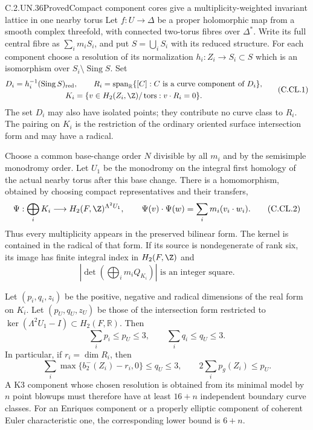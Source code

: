 \begin{statement}{C.2.UN.36}{Proved}{Compact component cores give a multiplicity-weighted invariant lattice in one nearby torus}
Let $f:U\to\Delta$ be a proper holomorphic map from
a smooth complex threefold, with connected two-torus
fibres over $\Delta^*$. Write its full central fibre
as $\sum_i m_iS_i$, and put $S=\bigcup_iS_i$ with
its reduced structure. For each component choose a
resolution of its normalization
$h_i:Z_i\to S_i\subset S$ which is an isomorphism
over $S_i\setminus\operatorname{Sing}S$. Set
\[
 \begin{gathered}
 D_i=h_i^{-1}(\operatorname{Sing}S)_{\rm red},\qquad
 R_i=\operatorname{span}_{\mathbb R}
       \{[C]:C\text{ is a curve component of }D_i\},
 \\
 K_i=\{v\in H_2(Z_i,\Z)/\operatorname{tors}:v\cdot R_i=0\}.
 \end{gathered}
                                                               \tag{C.CL.1}
\]
The set $D_i$ may also have isolated points; they
contribute no curve class to $R_i$. The pairing on
$K_i$ is the restriction of the ordinary oriented
surface intersection form and may have a radical.

Choose a common base-change order $N$ divisible by
all $m_i$ and by the semisimple monodromy order.
Let $U_1$ be the monodromy on the integral first
homology of the actual nearby torus after this
base change. There is a homomorphism, obtained by
choosing compact representatives and their transfers,
\[
 \Psi:\bigoplus_iK_i\longrightarrow
       H_2(F,\Z)^{\Lambda^2U_1},\qquad
 \Psi(v)\cdot\Psi(w)=\sum_i m_i(v_i\cdot w_i).
                                                               \tag{C.CL.2}
\]
Thus every multiplicity appears in the preserved
bilinear form. The kernel is contained in the
radical of that form. If its source is nondegenerate
of rank six, its image has finite integral index
in $H_2(F,\Z)$ and
\[
 \left|\det\left(\bigoplus_i m_iQ_{K_i}\right)\right|
                       \text{ is an integer square}.
                                                               \tag{C.CL.3}
\]

Let $(p_i,q_i,z_i)$ be the positive, negative and
radical dimensions of the real form on $K_i$.
Let $(p_U,q_U,z_U)$ be those of the intersection
form restricted to
$\ker(\Lambda^2U_1-I)\subset H_2(F,\mathbb R)$.
Then
\[
             \sum_i p_i\le p_U\le3,\qquad
             \sum_i q_i\le q_U\le3.                 \tag{C.CL.4}
\]
In particular, if $r_i=\dim R_i$, then
\[
 \sum_i\max\{b_2^-(Z_i)-r_i,0\}\le q_U\le3,
 \qquad
                 2\sum_i p_g(Z_i)\le p_U.           \tag{C.CL.5}
\]
A K3 component whose chosen resolution is obtained
from its minimal model by $n$ point blowups must
therefore have at least $16+n$ independent boundary
curve classes. For an Enriques component or a
properly elliptic component of coherent Euler
characteristic one, the corresponding lower bound
is $6+n$.


\end{statement}
